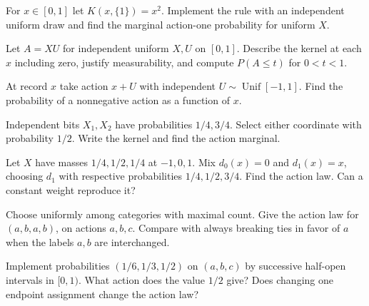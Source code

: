 \documentclass[11pt,oneside]{book}
\theoremstyle{definition}
\theoremstyle{remark}
\begin{document}
\begin{practiceexercise}
\label{wex:quadratic-action-probability}
For $x\in[0,1]$ let $K(x,\{1\})=x^2$. Implement the rule with an independent
uniform draw and find the marginal action-one probability for uniform $X$.
\end{practiceexercise}

\begin{practiceexercise}
\label{wex:scaled-uniform-action}
Let $A=XU$ for independent uniform $X,U$ on $[0,1]$. Describe the kernel at
each $x$ including zero, justify measurability, and compute $P(A\le t)$ for
$0<t<1$.
\end{practiceexercise}

\begin{practiceexercise}
\label{wex:symmetric-action-noise}
At record $x$ take action $x+U$ with independent
$U\sim\operatorname{Unif}[-1,1]$. Find the probability of a nonnegative
action as a function of $x$.
\end{practiceexercise}

\begin{practiceexercise}
\label{wex:select-a-coordinate-kernel}
Independent bits $X_1,X_2$ have probabilities $1/4,3/4$. Select either
coordinate with probability $1/2$. Write the kernel and find the action
marginal.
\end{practiceexercise}

\begin{practiceexercise}
\label{wex:gated-rule-mixture}
Let $X$ have masses $1/4,1/2,1/4$ at $-1,0,1$. Mix $d_0(x)=0$ and
$d_1(x)=x$, choosing $d_1$ with respective probabilities $1/4,1/2,3/4$. Find
the action law. Can a constant weight reproduce it?
\end{practiceexercise}

\begin{practiceexercise}
\label{wex:category-tie-kernel}
Choose uniformly among categories with maximal count. Give the action law
for $(a,b,a,b)$, on actions $a,b,c$. Compare with always breaking ties in
favor of $a$ when the labels $a,b$ are interchanged.
\end{practiceexercise}

\begin{practiceexercise}
\label{wex:three-interval-simulation}
Implement probabilities $(1/6,1/3,1/2)$ on $(a,b,c)$ by successive half-open
intervals in $[0,1)$. What action does the value $1/2$ give? Does changing
one endpoint assignment change the action law?
\end{practiceexercise}
\end{document}
